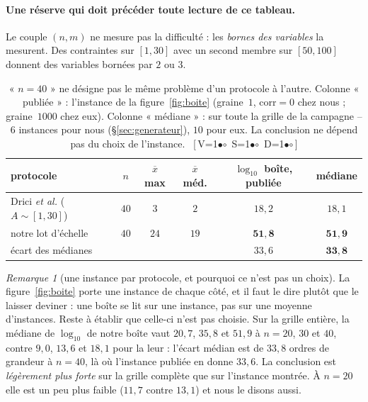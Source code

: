 \documentclass[11pt,a4paper]{article}
\theoremstyle{plain}
\theoremstyle{remark}
\newtheorem{remark}{Remarque}
\newcommand{\cfgm}[1]{\ifnum#1=1$\bullet$\else$\circ$\fi}
\newcommand{\conf}[3]{%
  \textsf{\footnotesize[\,V\cfgm{#1}\ S\cfgm{#2}\ D\cfgm{#3}\,]}}
\begin{document}
\paragraph{Une réserve qui doit précéder toute lecture de ce tableau.} Le
couple $(n,m)$ ne mesure pas la difficulté : les \emph{bornes des variables}
la mesurent. Des contraintes sur $[1,30]$ avec un second membre sur
$[50,100]$ donnent des variables bornées par $2$ ou $3$.

\begin{table}[H]
\centering
\caption{« $n=40$ » ne désigne pas le même problème d'un protocole à
l'autre. Colonne « publiée » : l'instance de la figure~\ref{fig:boite}
(graine~$1$, $\text{corr}=0$ chez nous ; graine~$1000$ chez eux). Colonne
« médiane » : sur toute la grille de la campagne -- $6$ instances pour nous
(§\ref{sec:generateur}), $10$ pour eux. La conclusion ne dépend pas du choix
de l'instance.\ \conf{0}{0}{0}}
\label{tab:boite}
\begin{tabular}{lccccc}
\toprule
protocole & $n$ & $\overline{x}$ max & $\overline{x}$ méd.
 & $\log_{10}$ boîte, publiée & médiane\\
\midrule
Drici \emph{et al.} ($A\sim[1,30]$) & $40$ & $3$ & $2$ & $18{,}2$ & $18{,}1$\\
notre lot d'échelle & $40$ & $24$ & $19$ & $\mathbf{51{,}8}$ & $\mathbf{51{,}9}$\\
\midrule
\multicolumn{4}{l}{écart des médianes} & $33{,}6$ & $\mathbf{33{,}8}$\\
\bottomrule
\end{tabular}
\end{table}

\begin{remark}[une instance par protocole, et pourquoi ce n'est pas un choix]
La figure~\ref{fig:boite} porte une instance de chaque côté, et il faut le
dire plutôt que le laisser deviner : une boîte se lit sur une instance, pas
sur une moyenne d'instances. Reste à établir que celle-ci n'est pas choisie.
Sur la grille entière, la médiane de $\log_{10}$ de notre boîte vaut $20{,}7$,
$35{,}8$ et $51{,}9$ à $n=20$, $30$ et $40$, contre $9{,}0$, $13{,}6$ et
$18{,}1$ pour la leur : l'écart médian est de $33{,}8$ ordres de grandeur à
$n=40$, là où l'instance publiée en donne $33{,}6$. La conclusion est
\emph{légèrement plus forte} sur la grille complète que sur l'instance
montrée. À $n=20$ elle est un peu plus faible ($11{,}7$ contre $13{,}1$) et
nous le disons aussi.
\end{remark}
\end{document}
